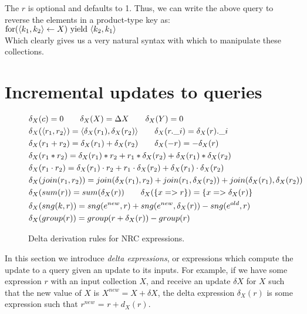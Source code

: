 {{{The $r$ is optional and defaults to 1. Thus, we can write the above query to reverse the elements in a product-type key as: \\

$\textrm{for}(\langle k_1, k_2 \rangle \leftarrow X) \textrm{ yield } \langle k_2, k_1 \rangle$ \\

Which clearly gives us a very natural syntax with which to manipulate these collections.

}

\section{Incremental updates to queries} {

\begin{figure}
\begin{equation*}
\begin{aligned}
&\delta_X(c) = 0 \qquad \delta_X(X) = \Delta X \qquad \delta_X(Y) = 0\\
&\delta_X(\langle r_1, r_2 \rangle) = \langle \delta_X(r_1), \delta_X(r_2) \rangle \qquad \delta_X(r.\_i) = \delta_X(r).\_i\\
&\delta_X(r_1 + r_2) = \delta_X(r_1) + \delta_X(r_2) \qquad \delta_X(-r) = -\delta_X(r)\\
&\delta_X(r_1 * r_2) = \delta_X(r_1)*r_2 + r_1*\delta_X(r_2) + \delta_X(r_1) * \delta_X(r_2) \\
&\delta_X(r_1 \cdot r_2) = \delta_X(r_1) \cdot r_2 + r_1 \cdot \delta_X(r_2) + \delta_X(r_1) \cdot \delta_X(r_2) \\
&\delta_X(join(r_1,r_2)) = join(\delta_X(r_1),r_2) + join(r_1,\delta_X(r_2)) + join(\delta_X(r_1),\delta_X(r_2)) \\
&\delta_X(sum(r)) = sum(\delta_X(r)) \qquad \delta_X(\{x => r\}) = \{x => \delta_X(r)\} \\
&\delta_X(sng(k,r)) = sng(e^{new},r)  + sng(e^{new},\delta_X(r)) - sng(e^{old},r) \\
&\delta_X(group(r)) = group(r + \delta_X(r)) - group(r)
\end{aligned}
\qquad
\end{equation*}
\caption{Delta derivation rules for NRC expressions.}
\label{deltaexprs}
\end{figure}

In this section we introduce \textit{delta expressions}, or expressions which compute the update to a query given an update to its inputs. For example, if we have some expression $r$ with an input collection $X$, and receive an update $\delta X$ for $X$ such that the new value of $X$ is $X^{new} = X + \delta X$, the delta expression $\delta_X(r)$ is some expression such that $r^{new}$ = $r + d_X(r)$.

}}}
